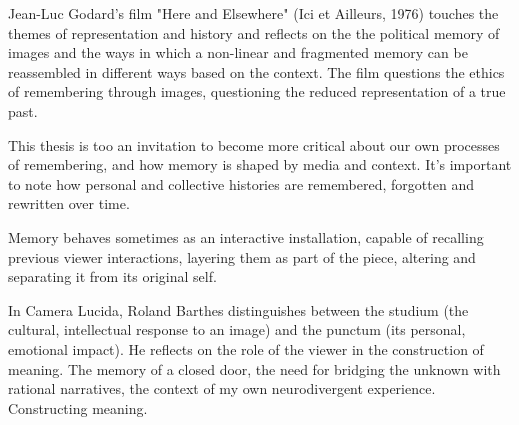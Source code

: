 Jean-Luc Godard's film "Here and Elsewhere" (Ici et Ailleurs, 1976) touches the themes of representation and history and reflects on the the political memory of images and the ways in which a non-linear and fragmented memory can be reassembled in different ways based on the context. The film questions the ethics of remembering through images, questioning the reduced representation of a true past. 

This thesis is too an invitation to become more critical about our own processes of remembering, and how memory is shaped by media and context. It's important to note how personal and collective histories are remembered, forgotten and rewritten over time.

Memory behaves sometimes as an interactive installation, capable of recalling previous viewer interactions, layering them as part of the piece, altering and separating it from its original self. 

In Camera Lucida, Roland Barthes distinguishes between the studium (the cultural, intellectual response to an image) and the punctum (its personal, emotional impact). He reflects on the role of the viewer in the construction of meaning. The memory of a closed door, the need for bridging the unknown with rational narratives, the context of my own neurodivergent experience. Constructing meaning.  \citep{barthes1993}





